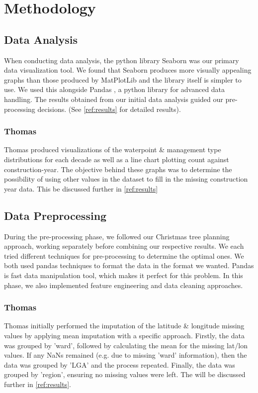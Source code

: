 \documentclass[conference]{IEEEtran}
\begin{document}
\section{Methodology}

\subsection{Data Analysis}

When conducting data analysis, the python library Seaborn \cite{seaborn} was our primary data visualization tool. We found that Seaborn produces more visually appealing graphs than those produced by MatPlotLib and the library itself is simpler to use. We used this alongside Pandas \cite{pandas}, a python library for advanced data handling. The results obtained from our initial data analysis guided our pre-processing decisions. (See \ref{ref:results} for detailed results).

\subsubsection{Thomas}

Thomas produced visualizations of the waterpoint \& management type distributions for each decade as well as a line chart plotting count against construction-year. The objective behind these graphs was to determine the possibility of using other values in the dataset to fill in the missing construction year data. This be discussed further in \ref{ref:results}

\subsection{Data Preprocessing}

During the pre-processing phase, we followed our Christmas tree planning approach, working separately before combining our respective results. We each tried different techniques for pre-processing to determine the optimal ones. We both used pandas techniques to format the data in the format we wanted. Pandas is fast data manipulation tool, which makes it perfect for this problem. In this phase, we also implemented feature engineering and data cleaning approaches.

\subsubsection{Thomas}

Thomas initially performed the imputation of the latitude \& longitude missing values by applying mean imputation with a specific approach. Firstly, the data was grouped by 'ward', followed by calculating the mean for the missing lat/lon values. If any NaNs remained (e.g. due to missing 'ward' information), then the data was grouped by 'LGA' and the process repeated. Finally, the data was grouped by 'region', ensuring no missing values were left. The will be discussed further in \ref{ref:results}.
\end{document}
